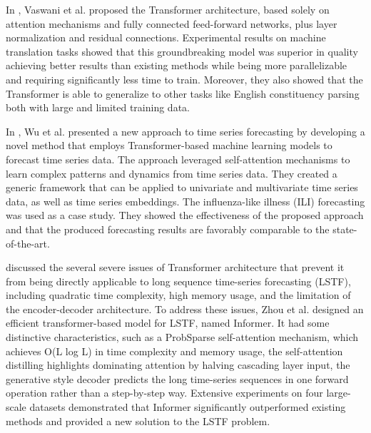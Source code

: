 In \cite{Vaswani2017}, Vaswani et al. proposed the Transformer architecture, based solely on attention mechanisms and fully connected feed-forward networks, plus layer normalization and residual connections.
Experimental results on machine translation tasks showed that this groundbreaking model was superior in quality achieving better results than existing methods while being more parallelizable and requiring significantly less time to train.
Moreover, they also showed that the Transformer is able to generalize to other tasks like English constituency parsing both with large and limited training data.

In \cite{Wu2020}, Wu et al. presented a new approach to time series forecasting by developing a novel method that employs Transformer-based machine learning models to forecast time series data.
The approach leveraged self-attention mechanisms to learn complex patterns and dynamics from time series data.
They created a generic framework that can be applied to univariate and multivariate time series data, as well as time series embeddings.
The influenza-like illness (ILI) forecasting was used as a case study.
They showed the effectiveness of the proposed approach and that the produced forecasting results are favorably comparable to the state-of-the-art.

\cite{Zhou2020} discussed the several severe issues of Transformer architecture that prevent it from being directly applicable to long sequence time-series forecasting (LSTF), including quadratic time complexity, high memory usage, and the limitation of the encoder-decoder architecture.
To address these issues, Zhou et al. designed an efficient transformer-based model for LSTF, named Informer.
It had some distinctive characteristics, such as a ProbSparse self-attention mechanism, which achieves O(L log L) in time complexity and memory usage, the self-attention distilling highlights dominating attention by halving cascading layer input, the generative style decoder predicts the long time-series sequences in one forward operation rather than a step-by-step way.
Extensive experiments on four large-scale datasets demonstrated that Informer significantly outperformed existing methods and provided a new solution to the LSTF problem.

